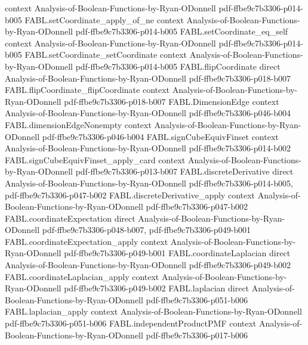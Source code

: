 \begin{theorem}
  {context}
  {Analysis-of-Boolean-Functions-by-Ryan-ODonnell}
  {pdf-ffbe9c7b3306-p014-b005}
\proofstep
  {FABL.setCoordinate_apply_of_ne}
  {context}
  {Analysis-of-Boolean-Functions-by-Ryan-ODonnell}
  {pdf-ffbe9c7b3306-p014-b005}
\proofstep
  {FABL.setCoordinate_eq_self}
  {context}
  {Analysis-of-Boolean-Functions-by-Ryan-ODonnell}
  {pdf-ffbe9c7b3306-p014-b005}
\proofstep
  {FABL.setCoordinate_setCoordinate}
  {context}
  {Analysis-of-Boolean-Functions-by-Ryan-ODonnell}
  {pdf-ffbe9c7b3306-p014-b005}
\proofstep
  {FABL.flipCoordinate}
  {direct}
  {Analysis-of-Boolean-Functions-by-Ryan-ODonnell}
  {pdf-ffbe9c7b3306-p018-b007}
\proofstep
  {FABL.flipCoordinate_flipCoordinate}
  {context}
  {Analysis-of-Boolean-Functions-by-Ryan-ODonnell}
  {pdf-ffbe9c7b3306-p018-b007}
\proofstep
  {FABL.DimensionEdge}
  {context}
  {Analysis-of-Boolean-Functions-by-Ryan-ODonnell}
  {pdf-ffbe9c7b3306-p046-b004}
\proofstep
  {FABL.dimensionEdgeNonempty}
  {context}
  {Analysis-of-Boolean-Functions-by-Ryan-ODonnell}
  {pdf-ffbe9c7b3306-p046-b004}
\proofstep
  {FABL.signCubeEquivFinset}
  {context}
  {Analysis-of-Boolean-Functions-by-Ryan-ODonnell}
  {pdf-ffbe9c7b3306-p014-b002}
\proofstep
  {FABL.signCubeEquivFinset_apply_card}
  {context}
  {Analysis-of-Boolean-Functions-by-Ryan-ODonnell}
  {pdf-ffbe9c7b3306-p013-b007}
\proofstep
  {FABL.discreteDerivative}
  {direct}
  {Analysis-of-Boolean-Functions-by-Ryan-ODonnell}
  {pdf-ffbe9c7b3306-p014-b005,
    pdf-ffbe9c7b3306-p047-b002}
\proofstep
  {FABL.discreteDerivative_apply}
  {context}
  {Analysis-of-Boolean-Functions-by-Ryan-ODonnell}
  {pdf-ffbe9c7b3306-p047-b002}
\proofstep
  {FABL.coordinateExpectation}
  {direct}
  {Analysis-of-Boolean-Functions-by-Ryan-ODonnell}
  {pdf-ffbe9c7b3306-p048-b007,
    pdf-ffbe9c7b3306-p049-b001}
\proofstep
  {FABL.coordinateExpectation_apply}
  {context}
  {Analysis-of-Boolean-Functions-by-Ryan-ODonnell}
  {pdf-ffbe9c7b3306-p049-b001}
\proofstep
  {FABL.coordinateLaplacian}
  {direct}
  {Analysis-of-Boolean-Functions-by-Ryan-ODonnell}
  {pdf-ffbe9c7b3306-p049-b002}
\proofstep
  {FABL.coordinateLaplacian_apply}
  {context}
  {Analysis-of-Boolean-Functions-by-Ryan-ODonnell}
  {pdf-ffbe9c7b3306-p049-b002}
\proofstep
  {FABL.laplacian}
  {direct}
  {Analysis-of-Boolean-Functions-by-Ryan-ODonnell}
  {pdf-ffbe9c7b3306-p051-b006}
\proofstep
  {FABL.laplacian_apply}
  {context}
  {Analysis-of-Boolean-Functions-by-Ryan-ODonnell}
  {pdf-ffbe9c7b3306-p051-b006}
\proofstep
  {FABL.independentProductPMF}
  {context}
  {Analysis-of-Boolean-Functions-by-Ryan-ODonnell}
  {pdf-ffbe9c7b3306-p017-b006}

\end{theorem}
